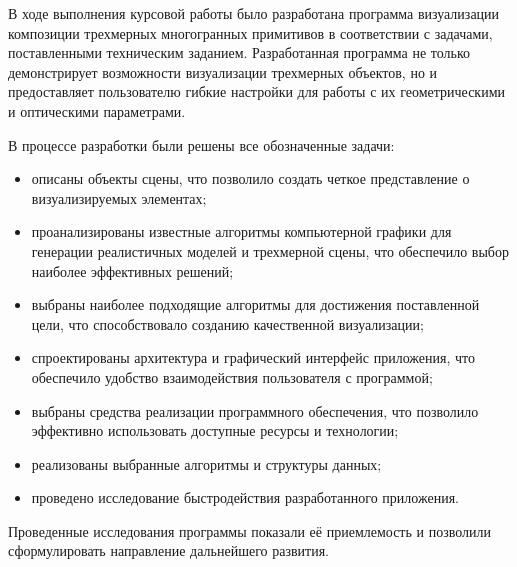 
В ходе выполнения курсовой работы было разработана программа визуализации композиции трехмерных многогранных примитивов в соответствии с задачами, поставленными техническим заданием. Разработанная программа не только демонстрирует возможности визуализации трехмерных объектов, но и предоставляет пользователю гибкие настройки для работы с их геометрическими и оптическими параметрами.

В процессе разработки были решены все обозначенные задачи:
\begin{itemize}[label=--]
	\item описаны объекты сцены, что позволило создать четкое представление о визуализируемых элементах;
	\item проанализированы известные алгоритмы компьютерной графики для генерации реалистичных моделей и трехмерной сцены, что обеспечило выбор наиболее эффективных решений;
	\item выбраны наиболее подходящие алгоритмы для достижения поставленной цели, что способствовало созданию качественной визуализации;
	\item спроектированы архитектура и графический интерфейс приложения, что обеспечило удобство взаимодействия пользователя с программой;
	\item выбраны средства реализации программного обеспечения, что позволило эффективно использовать доступные ресурсы и технологии;
	\item реализованы выбранные алгоритмы и структуры данных;
	\item проведено исследование быстродействия разработанного приложения.
\end{itemize}

Проведенные исследования программы показали её приемлемость и позволили сформулировать направление дальнейшего развития.